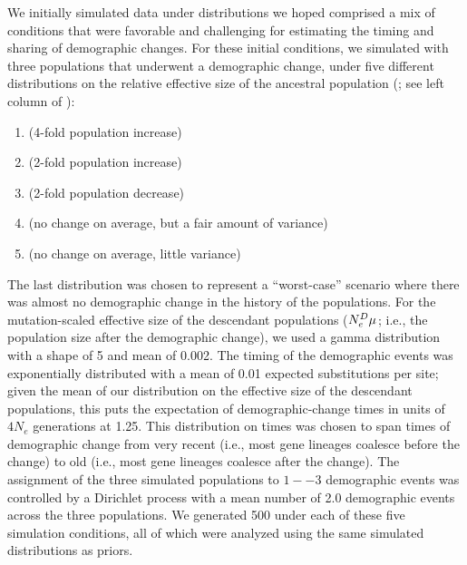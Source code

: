 We initially simulated data under distributions we hoped comprised a mix of
conditions that were favorable and challenging for estimating the timing and
sharing of demographic changes.
For these initial conditions, we simulated \datasets with three populations
that underwent a demographic change, under five different distributions on the
relative effective size of the ancestral population
(\rootrelativepopsize; see left column of
\figs
{}):
\begin{enumerate}[label=A.\arabic*]
    \item {} (4-fold population increase) \label{sims:initialFourFoldIncrease}
    \item {} (2-fold population increase)  \label{sims:initialTwoFoldIncrease}
    \item {} (2-fold population decrease)    \label{sims:initialTwoFoldDecrease}
    \item {} (no change on average, but a fair amount of variance) \label{sims:initialCenter}
    \item {} (no change on average, little variance) \label{sims:initialCenterNarrow}
\end{enumerate}
The last distribution was chosen to represent a ``worst-case'' scenario where
there was almost no demographic change in the history of the populations.
For the mutation-scaled effective size of the descendant populations
($\epopsize[\descendantpopindex{}]\murate$; i.e., the population size after the
demographic change),
we used a gamma distribution with a shape of 5 and mean of 0.002.
The timing of the demographic events was exponentially distributed with a mean
of 0.01 expected substitutions per site;
given the mean of our distribution on the effective size of the descendant
populations, this puts the expectation of demographic-change times in units of
$4N_e$ generations at 1.25.
This distribution on times was chosen to span times of demographic change from
very recent (i.e., most gene lineages coalesce before the change) to old (i.e.,
most gene lineages coalesce after the change).
The assignment of the three simulated populations to $1--3$ demographic events
was controlled by a Dirichlet process with a mean number of 2.0 demographic
events across the three populations.
We generated 500 \datasets under each of these five simulation conditions, all
of which were analyzed using the same simulated distributions as priors.

